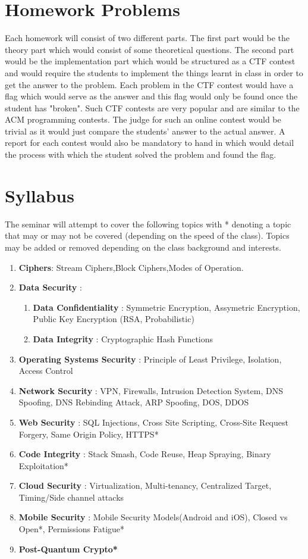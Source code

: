 \documentclass[11pt]{article}
\begin{document}
\section{Homework Problems}

Each homework will consist of two different parts. The first part would be the theory part which would consist of some theoretical questions. The second part would be the implementation part which would be structured as a CTF contest and would require the students to implement the things learnt in class in order to get the answer to the problem. Each problem in the CTF contest would have a flag which would serve as the answer and this flag would only be found once the student has "broken". Such CTF contests are very popular and are similar to the ACM programming contests. The judge for such an online contest would be trivial as it would just compare the students' answer to the actual answer. A report for each contest would also be mandatory to hand in which would detail the process with which the student solved the problem and found the flag.

\section{Syllabus}

The seminar will attempt to cover the following topics with * denoting a topic that may or may not be covered (depending on the speed of the class). Topics may be added or removed depending on the class background and interests.

\begin{enumerate}
	\item \textbf{Ciphers}: Stream Ciphers,Block Ciphers,Modes of Operation.
	\item \textbf{Data Security} : \begin{enumerate}
			\item \textbf{Data Confidentiality} : Symmetric Encryption, Assymetric Encryption, Public Key Encryption (RSA, Probabilistic) 
			\item \textbf{Data Integrity} : Cryptographic Hash Functions
	   \end{enumerate}
   \item \textbf{Operating Systems Security} : Principle of Least Privilege, Isolation, Access Control
   \item \textbf{Network Security} : VPN, Firewalls, Intrusion Detection System, DNS Spoofing, DNS Rebinding Attack, ARP Spoofing, DOS, DDOS 
   \item \textbf{Web Security} : SQL Injections, Cross Site Scripting, Cross-Site Request Forgery, Same Origin Policy, HTTPS*
   \item \textbf{Code Integrity} : Stack Smash, Code Reuse, Heap Spraying, Binary Exploitation* 
   \item \textbf{Cloud Security} : Virtualization, Multi-tenancy, Centralized Target, Timing/Side channel attacks
   \item \textbf{Mobile Security} : Mobile Security Models(Android and iOS), Closed vs Open*, Permissions Fatigue*
   \item \textbf{Post-Quantum Crypto*}
\end{enumerate}
\end{document}
